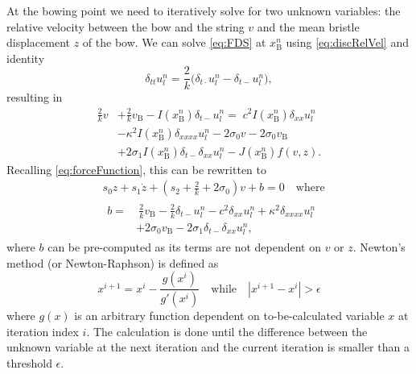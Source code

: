 \documentclass[twoside,a4paper]{article}
\begin{document}
At the bowing point we need to iteratively solve for two unknown variables: the relative velocity between the bow and the string $v$ and the mean bristle displacement $z$ of the bow.
We can solve \eqref{eq:FDS} at $x_\text{B}^n$ using \eqref{eq:discRelVel} and identity
\begin{equation}
    \delta_{tt}u_l^n = \frac{2}{k}\big(\delta_{t\cdot}u_l^n-\delta_{t-}u_l^n\big),
\end{equation}
resulting in 
\begin{equation}
\label{eq:stiffStringFDS}
\begin{aligned}
\frac{2}{k}v &+ \frac{2}{k}v_\text{B} - I(x_\text{B}^n) \delta_{t-}u_l^n = \; c^2 I(x_\text{B}^n)\delta_{xx} u_l^n \\
&-\kappa^2I(x_\text{B}^n)\delta_{xxxx} u_l^n - 2\sigma_0v
- 2\sigma_0v_\text{B}\\
&+ 2\sigma_1I(x_\text{B}^n)\delta_{t-}\delta_{xx}u_l^n - J(x_\text{B}^n)f(v, z).
\end{aligned}
\end{equation}
Recalling \eqref{eq:forceFunction}, this can be rewritten to
\begin{align}\label{eq:newtonFunction}
    &s_0z+s_1\dot z+(s_2 + \frac{2}{k} + 2\sigma_0)v + b = 0 \quad \text{where} \\
    & \begin{aligned}b =& \: \frac{2}{k}v_\text{B}-\frac{2}{k}\delta_{t-}u_l^n - c^2 \delta_{xx} u_l^n +\kappa^2\delta_{xxxx} u_l^n \\
    &+ 2\sigma_0v_\text{B}
- 2\sigma_1\delta_{t-}\delta_{xx}u_l^n,
\end{aligned}
\end{align}
where $b$ can be pre-computed as its terms are not dependent on $v$ or $z$.
Newton's method (or Newton-Raphson) is defined as
\begin{equation}
    x^{i+1} = x^{i} - \frac{g(x^i)}{g'(x^i)} \quad \text{while} \quad |x^{i+1}-x^i| > \epsilon
\end{equation}
where $g(x)$ is an arbitrary function dependent on to-be-calculated variable $x$ at iteration index $i$. The calculation is done until the difference between the unknown variable at the next iteration and the current iteration is smaller than a threshold $\epsilon$.
\end{document}
